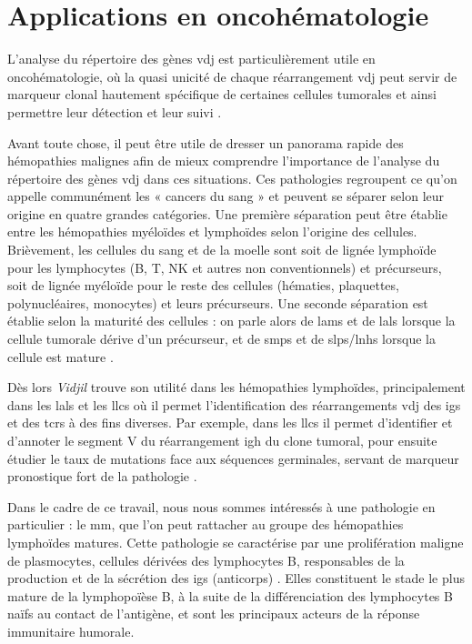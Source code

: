 \section{Applications en oncohématologie}

L'analyse du répertoire des gènes \gls{vdj} est particulièrement utile en oncohématologie, 
où la quasi unicité de chaque réarrangement \gls{vdj} peut servir de marqueur clonal hautement 
spécifique de certaines cellules tumorales et ainsi permettre leur détection et leur suivi \cite{hultcrantzBaselineVDJClonotype2020}.

\vspace{1em}
 
Avant toute chose, il peut être utile de dresser un panorama rapide des hémopathies malignes afin de 
mieux comprendre l'importance de l'analyse du répertoire des gènes \gls{vdj} dans ces situations.  
Ces pathologies regroupent ce qu'on appelle communément les « cancers du sang » et peuvent se séparer selon
leur origine en quatre grandes catégories. Une première séparation peut être établie entre les hémopathies 
myéloïdes et lymphoïdes selon l'origine des cellules. Brièvement, les cellules du sang et de la moelle sont soit de 
lignée lymphoïde pour les lymphocytes (B, T, NK et autres non conventionnels) et précurseurs, soit de lignée myéloïde 
pour le reste des cellules (hématies, plaquettes, polynucléaires, monocytes) et leurs précurseurs. Une seconde séparation 
est établie selon la maturité des cellules : on parle alors de \glspl{lam} et de \glspl{lal} lorsque la cellule 
tumorale dérive d'un précurseur, et de \glspl{smp} et de \glspl{slp}/\glspl{lnh} lorsque la cellule est mature 
\cite{alaggio5thEditionWorld2022a, khoury5thEditionWorld2022}.



Dès lors \textit{Vidjil} trouve son utilité dans les hémopathies lymphoïdes, principalement dans les \glspl{lal} et les 
\glspl{llc} où il permet l'identification des réarrangements \gls{vdj} des \glspl{ig} et des \glspl{tcr} à des fins diverses.
Par exemple, dans les \glspl{llc} il permet d'identifier et d'annoter le segment V du réarrangement \gls{igh} du clone tumoral, pour 
ensuite étudier le taux de mutations face aux séquences germinales, servant de marqueur pronostique fort de la pathologie
\cite{crombieIGHVMutationalStatus2017}.

\vspace{1em}

Dans le cadre de ce travail, nous nous sommes intéressés à une pathologie en particulier : le \gls{mm}, que l'on peut rattacher
au groupe des hémopathies lymphoïdes matures. Cette pathologie se caractérise par une prolifération maligne de plasmocytes, cellules
dérivées des lymphocytes B, responsables de la production et de la sécrétion des \glspl{ig} (anticorps) \cite{briglePathobiologyDiagnosisMultiple2017}. 
Elles constituent le stade le plus mature de la lymphopoïèse B, à la suite de la différenciation des lymphocytes B naïfs 
au contact de l'antigène, et sont les principaux acteurs de la réponse immunitaire humorale.

